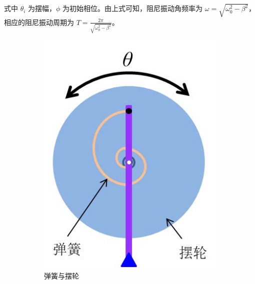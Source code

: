 \documentclass[12pt,a4paper]{amsart}
\begin{document}
式中 $\theta_i$ 为摆幅，$\phi$ 为初始相位。由上式可知，阻尼振动角频率为 $\omega = \sqrt{\omega_0^2 - \beta^2}$，相应的阻尼振动周期为 $T = \frac{2\pi}{\sqrt{\omega_0^2 - \beta^2}}$。

\begin{figure}
    \centering
    \begin{subfigure}[b]{0.2475\linewidth}
        \centering
        \includegraphics[width=\linewidth]{img/1.jpg}
        \caption{弹簧与摆轮}
        \label{fig:1}
    \end{subfigure}
    \hfill
    \begin{subfigure}[b]{0.2475\linewidth}
        \centering

\end{subfigure}
\end{figure}
\end{document}
